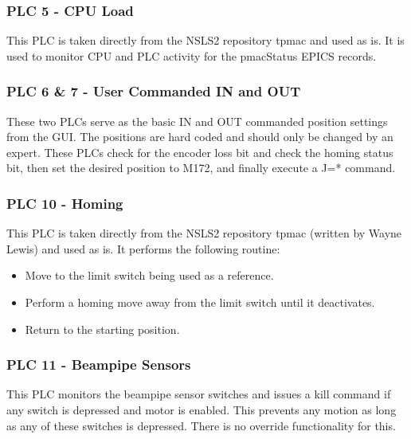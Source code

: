 \documentclass[12pt,letterpaper]{article}
\begin{document}
\subsubsection{PLC 5 - CPU Load}
This PLC is taken directly from the NSLS2 repository tpmac and used as is.  It is used to monitor CPU and PLC activity for the pmacStatus EPICS records.


\subsubsection{PLC 6 \& 7 - User Commanded IN and OUT}
These two PLCs serve as the basic IN and OUT commanded position settings from the GUI.  The positions are hard coded and should only be changed by an expert.  These PLCs check for the encoder loss bit and check the homing status bit, then set the desired position to M172, and finally execute a J=* command.

\subsubsection{PLC 10 - Homing}
This PLC is taken directly from the NSLS2 repository tpmac (written by Wayne Lewis) and used as is.  It performs the following routine:
\begin{itemize}
\item Move to the limit switch being used as a reference.
\item Perform a homing move away from the limit switch until it deactivates.
\item Return to the starting position.
\end{itemize}

\subsubsection{PLC 11 - Beampipe Sensors}
This PLC monitors the beampipe sensor switches and issues a kill command if any switch is depressed and motor is enabled.  This prevents any motion as long as any of these switches is depressed.  There is no override functionality for this.
\end{document}
